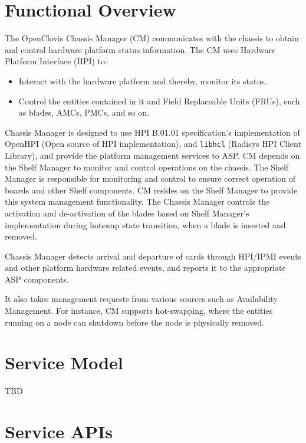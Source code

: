 
\hypertarget{group__group11}{
\chapter{Functional Overview}
\label{group__group11}
}

\begin{flushleft}

The OpenClovis Chassis Manager (CM) communicates with the chassis to obtain and control hardware platform status information. The CM uses Hardware 
Platform Interface (HPI) to: 
\begin{itemize}
\item
Interact with the hardware platform and thereby, monitor its status.
\item
Control the entities contained in it and Field Replaceable Units (FRUs), such as blades, AMCs, PMCs, and so on. 
\end{itemize}

Chassis Manager is designed to use HPI B.01.01 specification's implementation of OpenHPI (Open source of HPI implementation), and {\tt{libhcl}} (Radisys HPI 
Client Library), and provide the platform management services to ASP. CM depends on the Shelf Manager to monitor and control operations on the
chassis. The Shelf Manager is responsible for monitoring and control to ensure correct operation of boards and other Shelf components. CM resides on 
the Shelf Manager to provide this system management functionality. The Chassis Manager controls the activation and de-activation of the blades based on 
Shelf Manager's implementation during hotswap state transition, when a blade is inserted and removed.
\par
Chassis Manager detects arrival and departure of cards through HPI/IPMI events and other platform hardware related events, and reports it to the 
appropriate ASP components. 
\par
It also takes management requests from various sources such as Availability Management. For instance, CM supports hot-swapping, where the 
entities running on a node can shutdown before the node is physically removed.

\chapter{Service Model}
TBD

\chapter{Service APIs}


\end{flushleft}
